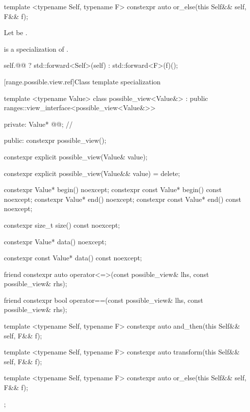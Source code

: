 \begin{itemdecl}
  template <typename Self, typename F>
  constexpr auto or_else(this Self&& self, F&& f);
\end{itemdecl}

\begin{itemdescr}
  Let  be .

  \pnum
  \mandates
   is a specialization of .

\pnum{}
\returns
\begin{codeblock}
self.@@ ? std::forward<Self>(self) : std::forward<F>(f)();
\end{codeblock}
\end{itemdescr}


[range.possible.view.ref]{Class template specialization}

\begin{codeblock}
template <typename Value>
class possible_view<Value&> : public ranges::view_interface<possible_view<Value&>> {
  private:
    Value* @@; // \expos{}

  public:
    constexpr possible_view();

    constexpr explicit possible_view(Value& value);

    constexpr explicit possible_view(Value&& value) = delete;

    constexpr Value*       begin() noexcept;
    constexpr const Value* begin() const noexcept;
    constexpr Value*       end() noexcept;
    constexpr const Value* end() const noexcept;

    constexpr size_t size() const noexcept;

    constexpr Value* data() noexcept;

    constexpr const Value* data() const noexcept;

    friend constexpr auto operator<=>(const possible_view& lhs,
                                      const possible_view& rhs);

    friend constexpr bool operator==(const possible_view& lhs,
                                     const possible_view& rhs);

    template <typename Self, typename F>
    constexpr auto and_then(this Self&& self, F&& f);

    template <typename Self, typename F>
    constexpr auto transform(this Self&& self, F&& f);

    template <typename Self, typename F>
    constexpr auto or_else(this Self&& self, F&& f);
};

\end{codeblock}

